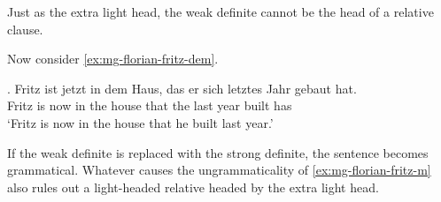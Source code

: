 Just as the extra light head, the weak definite cannot be the head of a relative clause.

Now consider \ref{ex:mg-florian-fritz-dem}.

\exg. Fritz ist jetzt in dem Haus, das er sich letztes Jahr gebaut hat.\\
Fritz is now in the house that the  last year built has\\
`Fritz is now in the house that he built last year.' \label{ex:mg-florian-fritz-dem}

If the weak definite is replaced with the strong definite, the sentence becomes grammatical.
Whatever causes the ungrammaticality of \ref{ex:mg-florian-fritz-m} also rules out a light-headed relative headed by the extra light head.
